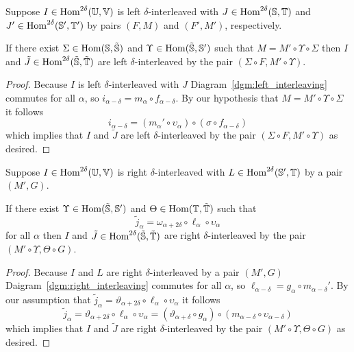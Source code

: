 
\begin{lemma}\label{lem:left}
  Suppose $I\in\mathrm{Hom}^{2\delta}(\mathbb{U}, \mathbb{V})$ is left $\delta$-interleaved with $J\in\mathrm{Hom}^{2\delta}(\mathbb{S},\mathbb{T})$ and $J'\in\mathrm{Hom}^{2\delta}(\mathbb{S}',\mathbb{T}')$ by pairs $(F, M)$ and $(F', M')$, respectively.

  If there exist $\Sigma\in\mathrm{Hom}(\mathbb{S},\tilde{\mathbb{S}})$ and $\Upsilon\in\mathrm{Hom}(\tilde{\mathbb{S}}, \mathbb{S}')$ such that $M = M'\circ\Upsilon\circ\Sigma$ then $I$ and $\tilde{J}\in\mathrm{Hom}^{2\delta}(\tilde{\mathbb{S}},\tilde{\mathbb{T}})$ are left $\delta$-interleaved by the pair $(\Sigma\circ F, M'\circ\Upsilon)$.
\end{lemma}
\begin{proof}
  Because $I$ is left $\delta$-interleaved with $J$ Diagram~\ref{dgm:left_interleaving} commutes for all $\alpha$, so $i_{\alpha-\delta} = m_\alpha\circ f_{\alpha-\delta}$.
  By our hypothesis that $M = M'\circ\Upsilon\circ\Sigma$ it follows
  \[ i_{\alpha-\delta} = (m_\alpha'\circ\upsilon_\alpha)\circ(\sigma\circ f_{\alpha-\delta}) \]
  which implies that $I$ and $\tilde{J}$ are left $\delta$-interleaved by the pair $(\Sigma\circ F, M'\circ\Upsilon)$ as desired.
\end{proof}

\begin{lemma}\label{lem:right}
  Suppose $I\in\mathrm{Hom}^{2\delta}(\mathbb{U}, \mathbb{V})$ is right $\delta$-interleaved with $L\in\mathrm{Hom}^{2\delta}(\mathbb{S}',\mathbb{T})$ by a pair $(M', G)$.

  If there exist $\Upsilon\in\mathrm{Hom}(\tilde{\mathbb{S}},\mathbb{S}')$ and $\Theta\in\mathrm{Hom}(\mathbb{T},\tilde{\mathbb{T}})$ such that
  \[\tilde{j}_\alpha = \omega_{\alpha+2\delta}\circ \ell_\alpha\circ\upsilon_\alpha \]
  for all $\alpha$ then $I$ and $\tilde{J}\in\mathrm{Hom}^{2\delta}(\tilde{\mathbb{S}},\tilde{\mathbb{T}})$ are right $\delta$-interleaved by the pair $(M'\circ\Upsilon, \Theta\circ G)$.
\end{lemma}
\begin{proof}
  Because $I$ and $L$ are right $\delta$-interleaved by a pair $(M', G)$ Daigram~\ref{dgm:right_interleaving} commutes for all $\alpha$, so $\ell_{\alpha-\delta} = g_\alpha\circ m_{\alpha-\delta}'$.
  By our assumption that $\tilde{j}_\alpha = \vartheta_{\alpha+2\delta}\circ \ell_\alpha\circ\upsilon_\alpha$ it follows
  \[ \tilde{j}_\alpha = \vartheta_{\alpha+2\delta}\circ \ell_\alpha\circ\upsilon_\alpha = (\vartheta_{\alpha+\delta}\circ g_\alpha)\circ (m_{\alpha-\delta}\circ\upsilon_{\alpha-\delta}) \]
  which implies that $I$ and $\tilde{J}$ are right $\delta$-interleaved by the pair $(M'\circ \Upsilon, \Theta\circ G)$ as desired.
\end{proof}

